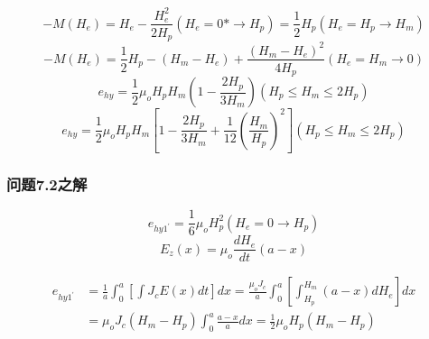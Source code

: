 \begin{equation}%
-M(H_e)=H_e-\frac{H_{e}^{2}}{2H_p}                          (H_e=0*\rightarrow H_p)
=\frac{1}{2}H_p                                      (H_e=H_p\rightarrow H_m)
\end{equation}
\begin{equation}%
-M(H_e)=\frac{1}{2}H_p-(H_m-H_e)+\frac{(H_m-H_e)^2}{4H_p}   (H_e=H_m\rightarrow 0)
\end{equation}
\begin{equation}%
e_{hy}=\frac{1}{2}\mu_oH_pH_m\left(1-\frac{2H_p}{3H_m}\right)   (H_p\leq H_m\leq 2H_p)
\end{equation}
\begin{equation}%
e_{hy}=\frac{1}{2}\mu_oH_pH_m\left[1-\frac{2H_p}{3H_m}+\frac{1}{12}\left(\frac{H_m}{H_p}\right)^2\right]     (H_p\leq H_m \leq 2H_p)
\end{equation}

\subsubsection{问题7.2之解}
\begin{equation}%
e_{hy1^\prime}=\frac{1}{6}\mu_oH_{p}^{2}       (H_e=0\rightarrow H_p)
\end{equation}
\begin{equation}%
E_z(x)=\mu_o\frac{dH_e}{dt}(a-x)
\end{equation}

\begin{subequations}
\begin{align*}%
e_{hy1^\prime}&=\frac{1}{a}\int_{0}^{a}\left[\int J_cE(x)dt\right]dx=\frac{\mu_oJ_c}{a}\int_{0}^{a}\left[\int_{H_p}^{H_m}(a-x)dH_e\right]dx \\
&=\mu_oJ_c(H_m-H_p)\int_{0}^{a}\frac{a-x}{a}dx=\frac{1}{2}\mu_oH_p(H_m-H_p)
\end{align*}
\end{subequations}




